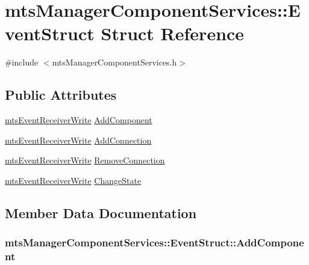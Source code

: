 \hypertarget{structmts_manager_component_services_1_1_event_struct}{}\section{mts\+Manager\+Component\+Services\+:\+:Event\+Struct Struct Reference}
\label{structmts_manager_component_services_1_1_event_struct}


{\ttfamily \#include $<$mts\+Manager\+Component\+Services.\+h$>$}

\subsection*{Public Attributes}
\begin{DoxyCompactItemize}
\item 
\hyperlink{classmts_event_receiver_write}{mts\+Event\+Receiver\+Write} \hyperlink{structmts_manager_component_services_1_1_event_struct_a5eb66fcf09966335bea86277857a9ae8}{Add\+Component}
\item 
\hyperlink{classmts_event_receiver_write}{mts\+Event\+Receiver\+Write} \hyperlink{structmts_manager_component_services_1_1_event_struct_a6e99e7d1807c8eb2dfcc7ffe670d7ddb}{Add\+Connection}
\item 
\hyperlink{classmts_event_receiver_write}{mts\+Event\+Receiver\+Write} \hyperlink{structmts_manager_component_services_1_1_event_struct_ac10cc608ffc0312aaeb4c3860e1c24c2}{Remove\+Connection}
\item 
\hyperlink{classmts_event_receiver_write}{mts\+Event\+Receiver\+Write} \hyperlink{structmts_manager_component_services_1_1_event_struct_a9b69075f40fdc89a7df1d635ce388946}{Change\+State}
\end{DoxyCompactItemize}


\subsection{Member Data Documentation}
\hypertarget{structmts_manager_component_services_1_1_event_struct_a5eb66fcf09966335bea86277857a9ae8}{}
\subsubsection[{Add\+Component}]{ mts\+Manager\+Component\+Services\+::\+Event\+Struct\+::\+Add\+Component}\label{structmts_manager_component_services_1_1_event_struct_a5eb66fcf09966335bea86277857a9ae8}
\hypertarget{structmts_manager_component_services_1_1_event_struct_a6e99e7d1807c8eb2dfcc7ffe670d7ddb}{}
